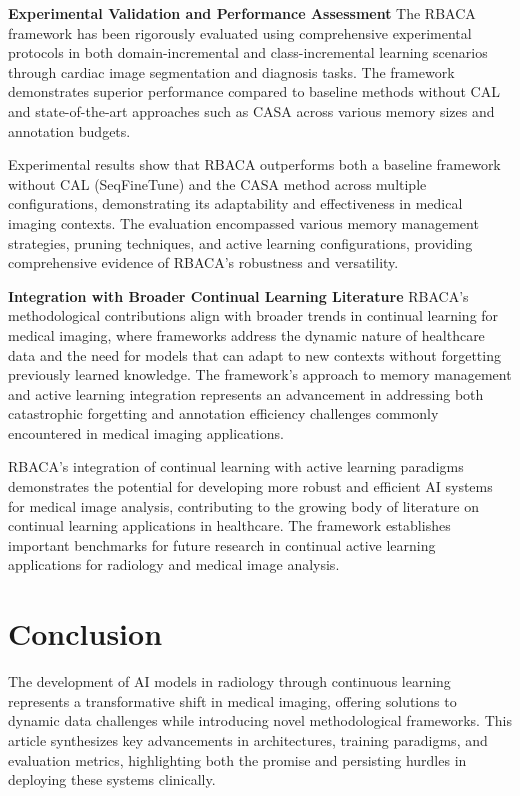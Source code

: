 \documentclass{IEEEcsmag}
\begin{document}
    \textbf{Experimental Validation and Performance Assessment}\newline
    The RBACA framework has been rigorously evaluated using comprehensive experimental protocols in both domain-incremental and class-incremental learning scenarios through cardiac image segmentation and diagnosis tasks\cite{cite-19}.
    The framework demonstrates superior performance compared to baseline methods without CAL and state-of-the-art approaches such as CASA across various memory sizes and annotation budgets.
    
    Experimental results show that RBACA outperforms both a baseline framework without CAL (SeqFineTune) and the CASA method across multiple configurations, demonstrating its adaptability and effectiveness in medical imaging contexts\cite{cite-19}.
    The evaluation encompassed various memory management strategies, pruning techniques, and active learning configurations, providing comprehensive evidence of RBACA's robustness and versatility.
    
    \textbf{Integration with Broader Continual Learning Literature}\newline
    RBACA's methodological contributions align with broader trends in continual learning for medical imaging, where frameworks address the dynamic nature of healthcare data and the need for models that can adapt to new contexts without forgetting previously learned knowledge\cite{cite-18}.
    The framework's approach to memory management and active learning integration represents an advancement in addressing both catastrophic forgetting and annotation efficiency challenges commonly encountered in medical imaging applications\cite{cite-19}.
    
    RBACA's integration of continual learning with active learning paradigms demonstrates the potential for developing more robust and efficient AI systems for medical image analysis, contributing to the growing body of literature on continual learning applications in healthcare\cite{cite-27}.
    The framework establishes important benchmarks for future research in continual active learning applications for radiology and medical image analysis.

\section{Conclusion}

    The development of AI models in radiology through continuous learning represents a transformative shift in medical imaging, offering solutions to dynamic data challenges while introducing novel methodological frameworks. 
    This article synthesizes key advancements in architectures, training paradigms, and evaluation metrics, highlighting both the promise and persisting hurdles in deploying these systems clinically.
    
\end{document}
